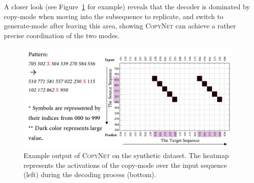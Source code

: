 
%
A closer look (see Figure~\ref{syn} for example) reveals that the decoder is dominated by copy-mode when moving into the subsequence to replicate, and switch to generate-mode after leaving this area, showing \textsc{CopyNet} can achieve a rather precise coordination of the two modes. \vspace{-5pt}    
\begin{figure}[h!]
   	\centering
          	\vspace{-5pt}
          	\includegraphics[width=.98\linewidth]{figs/copynet/syn2.pdf} 
          	\vspace{-10pt}
          	\caption{\label{syn} Example output of \textsc{CopyNet} on the synthetic dataset. The heatmap represents the activations of the copy-mode over the input sequence (left) during the decoding process (bottom).} 
   \vspace{-17pt}
  \end{figure}   


